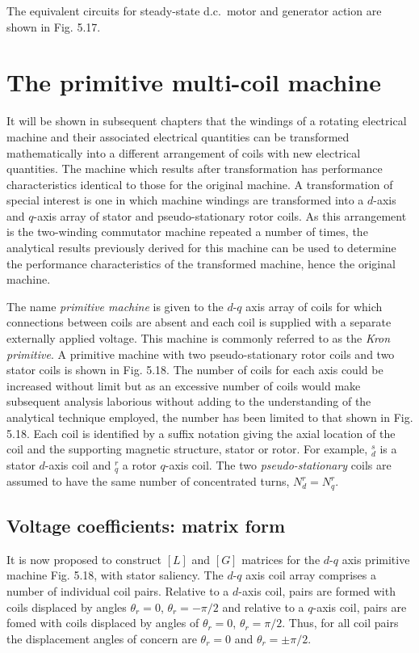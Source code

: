 \documentclass[a4paper,numbers=noenddot,12pt]{scrbook}
\begin{document}
The equivalent circuits for steady-state d.c.\ motor and generator action are shown in Fig. 5.17.

\section{The primitive multi-coil machine}
It will be shown in subsequent chapters that the windings of a rotating electrical machine and their associated electrical quantities can be transformed mathematically into a different arrangement of coils with new electrical quantities. The machine which results after transformation has performance characteristics identical to those for the original machine. A transformation of special interest is one in which machine windings are transformed into a $d$-axis and $q$-axis array of stator and pseudo-stationary rotor coils. As this arrangement is the two-winding commutator machine repeated a number of times, the analytical results previously derived for this machine can be used to determine the performance characteristics of the transformed machine, hence the original machine.

The name \emph{primitive machine} is given to the $d$-$q$ axis array of coils for which connections between coils are absent and each coil is supplied with a separate externally applied voltage. This machine is commonly referred to as the \emph{Kron primitive}. A primitive machine with two pseudo-stationary rotor coils and two stator coils is shown in Fig. 5.18. The number of coils for each axis could be increased without limit but as an excessive number of coils would make subsequent analysis laborious without adding to the understanding of the analytical technique employed, the number has been limited to that shown in Fig. 5.18. Each coil is identified by a suffix notation giving the axial location of the coil and the supporting magnetic structure, stator or rotor. For example, $_d^s$ is a stator $d$-axis coil and $_q^r$ a rotor $q$-axis coil. The two \emph{pseudo-stationary} coils are assumed to have the same number of concentrated turns, $N_d^r = N_q^r$.
\subsection{Voltage coefficients: matrix form} 
It is now proposed to construct $[L]$ and $[G]$ matrices for the $d$-$q$ axis primitive machine Fig. 5.18, with stator saliency. The $d$-$q$ axis coil array comprises a number of individual coil pairs. Relative to a $d$-axis coil, pairs are formed with coils displaced by angles $\theta_r = 0$, $\theta_r = -\pi/2$ and relative to a $q$-axis coil, pairs are fomed with coils displaced by angles of $\theta_r = 0$, $\theta_r = \pi/2$. Thus, for all coil pairs the displacement angles of concern are $\theta_r = 0$ and $\theta_r = \pm \pi / 2$.
\end{document}
